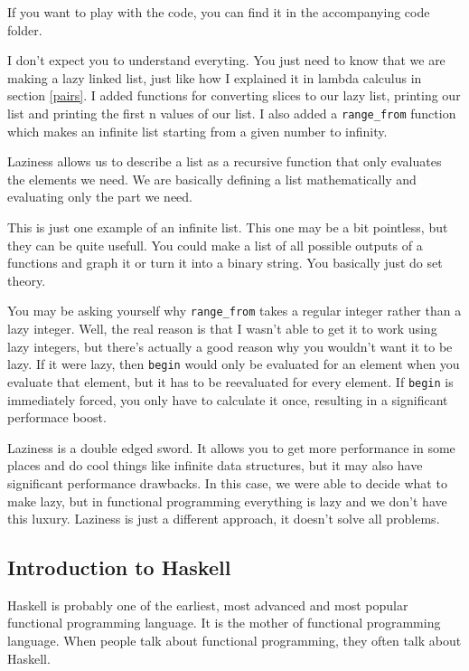 \documentclass[11pt]{article}
\begin{document}
If you want to play with the code, you can find it in the accompanying code
folder.

I don't expect you to understand everyting. You just need to know that we are
making a lazy linked list, just like how I explained it in lambda calculus in
section \ref{pairs}. I added functions for converting slices to our lazy list,
printing our list and printing the first n values of our list. I also added a
\texttt{range\_from} function which makes an infinite list starting from a
given number to infinity.

Laziness allows us to describe a list as a recursive function that only
evaluates the elements we need. We are basically defining a list mathematically
and evaluating only the part we need.

This is just one example of an infinite list. This one may be a bit pointless,
but they can be quite usefull. You could make a list of all possible outputs of
a functions and graph it or turn it into a binary string. You basically just do
set theory.


You may be asking yourself why \texttt{range\_from} takes a regular integer
rather than a lazy integer. Well, the real reason is that I wasn't able to get
it to work using lazy integers, but there's actually a good reason why you
wouldn't want it to be lazy. If it were lazy, then \texttt{begin} would only be
evaluated for an element when you evaluate that element, but it has to be
reevaluated for every element. If \texttt{begin} is immediately forced, you
only have to calculate it once, resulting in a significant performace boost.

Laziness is a double edged sword. It allows you to get more performance in some
places and do cool things like infinite data structures, but it may also have
significant performance drawbacks. In this case, we were able to decide what to
make lazy, but in functional programming everything is lazy and we don't have
this luxury. Laziness is just a different approach, it doesn't solve all
problems.


\subsection{Introduction to Haskell}

Haskell is probably one of the earliest, most advanced and most popular
functional programming language. It is the mother of functional programming
language. When people talk about functional programming, they often talk about
Haskell.
\end{document}
